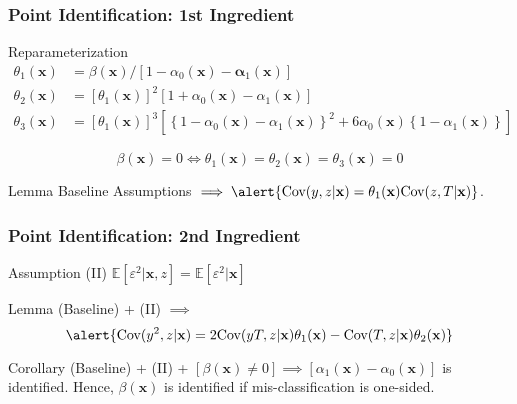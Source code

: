 \documentclass{beamer}
\begin{document}
\begin{frame}
  \frametitle{Point Identification: 1st Ingredient}


  \vspace{-1em}

  \begin{block}{Reparameterization}
    \vspace{-1em}
\begin{align*}
  \theta_1(\mathbf{x}) &= \beta(\mathbf{x})/\left[ 1 - \alpha_0(\mathbf{x}) - \mathbf{\alpha}_1(\mathbf{x})  \right]\\
  \theta_2(\mathbf{x}) &= \left[\theta_1(\mathbf{x})\right]^2 \left[ 1 + \alpha_0(\mathbf{x}) - \alpha_1(\mathbf{x})\right] \\
  \theta_3(\mathbf{x}) &= \left[\theta_1(\mathbf{x})\right]^3\left[ \left\{ 1 - \alpha_0(\mathbf{x}) - \alpha_1(\mathbf{x}) \right\}^2 + 6\alpha_0(\mathbf{x})\left\{ 1 - \alpha_1(\mathbf{x}) \right\} \right]
\end{align*}

\[\boxed{\beta(\mathbf{x}) = 0 \iff \theta_1(\mathbf{x}) = \theta_2(\mathbf{x}) = \theta_3(\mathbf{x}) = 0}\]
  \end{block}

  \vspace{-1.5em}

  \begin{block}{Lemma}
    Baseline Assumptions $\implies \alert{\mbox{Cov}(y,z|\mathbf{x}) = \theta_1(\mathbf{x}) \mbox{Cov}(z,T|\mathbf{x})}$.
  \end{block}

\end{frame}
\begin{frame}
  \frametitle{Point Identification: 2nd Ingredient}

  \begin{block}{Assumption (II)}
    $\mathbb{E}[\varepsilon^2|\mathbf{x},z] = \mathbb{E}[\varepsilon^2|\mathbf{x}]$
  \end{block}

  \begin{block}{Lemma}
    (Baseline) + (II) $\implies$ 
    \[
      \alert{\mbox{Cov}(y^2,z|\mathbf{x}) = 2\mbox{Cov}(yT,z|\mathbf{x}) \theta_1(\mathbf{x}) -\mbox{Cov}(T,z|\mathbf{x})\theta_2(\mathbf{x})}
    \]
  \end{block}

  \begin{block}{Corollary}
    (Baseline) + (II) + $[\beta(\mathbf{x})\neq 0] \implies \left[ \alpha_1(\mathbf{x}) - \alpha_0(\mathbf{x}) \right]$ is identified. Hence, $\beta(\mathbf{x})$ is identified if mis-classification is one-sided.
  \end{block}
    

  
\end{frame}
\end{document}
